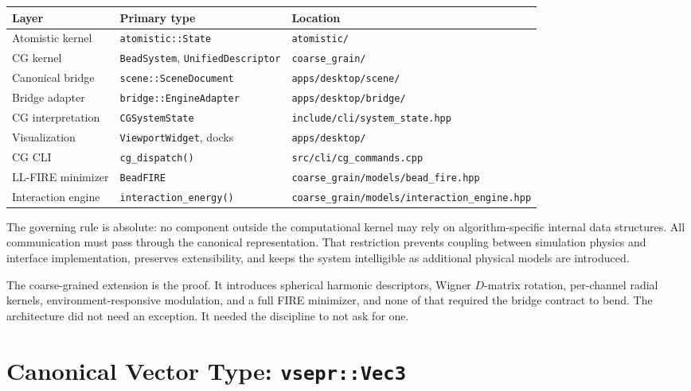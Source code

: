 ﻿\documentclass[11pt]{article}
\newcommand{\file}[1]{\texttt{#1}}
\newcommand{\type}[1]{\texttt{#1}}
\newcommand{\op}[1]{\texttt{#1}}
\begin{document}
\begin{center}
\begin{tabular}{lll}
\toprule
Layer & Primary type & Location \\
\midrule
Atomistic kernel     & \type{atomistic::State}       & \file{atomistic/} \\
CG kernel            & \type{BeadSystem}, \type{UnifiedDescriptor} & \file{coarse\_grain/} \\
Canonical bridge     & \type{scene::SceneDocument}    & \file{apps/desktop/scene/} \\
Bridge adapter       & \type{bridge::EngineAdapter}   & \file{apps/desktop/bridge/} \\
CG interpretation    & \type{CGSystemState}           & \file{include/cli/system\_state.hpp} \\
Visualization        & \type{ViewportWidget}, docks   & \file{apps/desktop/} \\
CG CLI               & \op{cg\_dispatch()}            & \file{src/cli/cg\_commands.cpp} \\
LL-FIRE minimizer    & \type{BeadFIRE}                & \file{coarse\_grain/models/bead\_fire.hpp} \\
Interaction engine   & \op{interaction\_energy()}     & \file{coarse\_grain/models/interaction\_engine.hpp} \\
\bottomrule
\end{tabular}
\end{center}

The governing rule is absolute: no component outside the computational kernel
may rely on algorithm-specific internal data structures. All communication
must pass through the canonical representation. That restriction prevents
coupling between simulation physics and interface implementation, preserves
extensibility, and keeps the system intelligible as additional physical models
are introduced.

The coarse-grained extension is the proof. It introduces spherical harmonic
descriptors, Wigner $D$-matrix rotation, per-channel radial kernels,
environment-responsive modulation, and a full FIRE minimizer, and none of
that required the bridge contract to bend. The architecture did not need an
exception. It needed the discipline to not ask for one.

\section{Canonical Vector Type: \type{vsepr::Vec3}}
\end{document}
